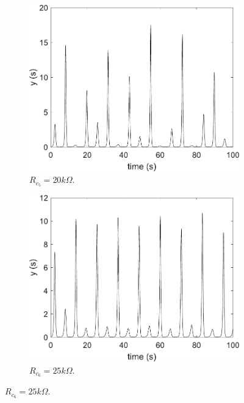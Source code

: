 	    \begin{figure}
        \centering
        \begin{subfigure}[b]{0.22\textwidth}
            \centering
            \includegraphics[scale=0.28]{figs/paraCup/outParaC20.pdf}
            \caption{$R_{c_5} = 20k\Omega$.}    
        \end{subfigure}
        \begin{subfigure}[b]{0.22\textwidth}  
            \centering 
            \includegraphics[scale=0.28]{figs/paraCup/outParaC25.pdf}
            \caption{$R_{c_6} = 25k\Omega$.}  
        \end{subfigure}

\end{figure}
